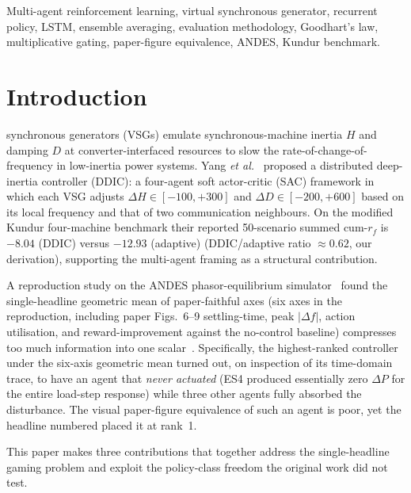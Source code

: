 \documentclass[journal,onecolumn,11pt]{IEEEtran}
\begin{document}
\begin{IEEEkeywords}
Multi-agent reinforcement learning, virtual synchronous generator,
recurrent policy, LSTM, ensemble averaging, evaluation methodology,
Goodhart's law, multiplicative gating, paper-figure equivalence,
ANDES, Kundur benchmark.
\end{IEEEkeywords}

\section{Introduction}\label{sec:intro}

 synchronous generators (VSGs)
\cite{zhong2011vsg,beck2007vsg,darco2015vsm} emulate
synchronous-machine inertia $H$ and damping $D$ at converter-interfaced
resources to slow the rate-of-change-of-frequency in low-inertia
power systems. Yang \emph{et al.}~\cite{yang2023ddic} proposed a
distributed deep-inertia controller (DDIC): a four-agent soft
actor-critic (SAC) \cite{haarnoja2018sac} framework in which each VSG
adjusts $\Delta H \in [-100, +300]$ and $\Delta D \in [-200, +600]$
based on its local frequency and that of two communication neighbours.
On the modified Kundur four-machine benchmark
\cite{kundur1994power,klein1991study} their reported 50-scenario
summed cum-$r_f$ is $-8.04$ (DDIC) versus $-12.93$ (adaptive)
\cite[Sec.~IV-C, Fig.~5]{yang2023ddic} (DDIC/adaptive ratio
$\approx 0.62$, our derivation), supporting the
multi-agent framing as a structural contribution.

A reproduction study on the ANDES phasor-equilibrium
simulator~\cite{cui2021andes,milano2018foundations} found the
single-headline geometric mean of paper-faithful axes (six axes in
the reproduction, including paper Figs.~6--9 settling-time, peak
$|\Delta f|$, action utilisation, and reward-improvement against the
no-control baseline) compresses too much information into one
scalar~\cite{wei2026reproduction}. Specifically, the highest-ranked
controller under the six-axis geometric mean turned out, on
inspection of its time-domain trace, to have an agent that
\emph{never actuated} (ES4 produced essentially zero $\Delta P$ for
the entire load-step response) while three other agents fully
absorbed the disturbance. The visual paper-figure equivalence of such
an agent is poor, yet the headline numbered placed it at rank~1.

This paper makes three contributions that together address the
single-headline gaming problem and exploit the policy-class freedom
the original work did not test.
\end{document}
